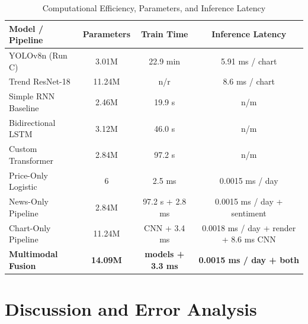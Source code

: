 \documentclass[10pt,journal]{IEEEtran}
\begin{document}
\begin{table}[htbp]
\centering
\caption{Computational Efficiency, Parameters, and Inference Latency}
\label{tab:efficiency}
\begin{tabular}{lccc}
\toprule
\textbf{Model / Pipeline} & \textbf{Parameters} & \textbf{Train Time} & \textbf{Inference Latency} \\
\midrule
YOLOv8n (Run C)         & 3.01M  & 22.9 min  & 5.91 ms / chart \\
Trend ResNet-18         & 11.24M & n/r       & 8.6 ms / chart \\
Simple RNN Baseline     & 2.46M  & 19.9 s    & n/m \\
Bidirectional LSTM      & 3.12M  & 46.0 s    & n/m \\
Custom Transformer      & 2.84M  & 97.2 s    & n/m \\
Price-Only Logistic     & 6      & 2.5 ms    & 0.0015 ms / day \\
News-Only Pipeline      & 2.84M  & 97.2 s + 2.8 ms & 0.0015 ms / day + sentiment \\
Chart-Only Pipeline     & 11.24M & CNN + 3.4 ms & 0.0018 ms / day + render + 8.6 ms CNN \\
\textbf{Multimodal Fusion} & \textbf{14.09M} & \textbf{models + 3.3 ms} & \textbf{0.0015 ms / day + both} \\
\bottomrule
\end{tabular}
\end{table}

\section{Discussion and Error Analysis}
\label{sec:discussion}
\end{document}
